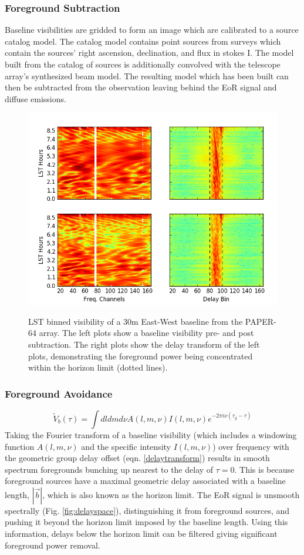 \documentclass[a0,landscape]{a0poster}
\begin{document}
\begin{multicols}{4}
\subsubsection*{Foreground Subtraction}
Baseline visibilities are gridded to form an image which are calibrated to a source catalog model. The catalog model contains point sources from surveys which contain the sources' right ascension, declination, and flux in stokes I. The model built from the catalog of sources is additionally convolved with the telescope array's synthesized beam model. The resulting model which has been built can then be subtracted from the observation leaving behind the EoR signal and diffuse emissions.
\begin{figure}[H]
\centering
\label{fig:foresubtract}
\includegraphics[width=0.6\linewidth]{figures/foresub.png}\\
\caption{LST binned visibility of a 30m East-West baseline from the PAPER-64 array. The left plots show a baseline visibility pre- and post subtraction. The right plots show the delay transform of the left plots, demonstrating the foreground power being concentrated within the horizon limit (dotted lines).}
\end{figure}


\subsubsection*{Foreground Avoidance}
\begin{equation}
\label{delaytransform}
\widetilde{V}_b(\tau) = \int dl dm d\nu A(l,m,\nu)I(l,m,\nu)e^{-2\pi i\nu(\tau_g -\tau)}
\end{equation}
Taking the Fourier transform of a baseline visibility (which includes a windowing function $A(l,m,\nu)$ and the specific intensity $I(l,m,\nu)$) over frequency with the geometric group delay offset (eqn. \ref{delaytransform}) results in 
smooth spectrum foregrounds bunching up nearest to the delay of $\tau = 0$. This is because foreground sources have a maximal geometric 
delay associated with a baseline length, $|\vec{b}|$, which is also known as the horizon limit. The EoR signal is unsmooth spectrally (Fig. \ref{fig:delayspace}), 
distinguishing it from foreground sources, and pushing it beyond the horizon limit imposed by the baseline length. Using this information, 
delays below the horizon limit can be filtered giving significant foreground power removal.


\end{multicols}
\end{document}
